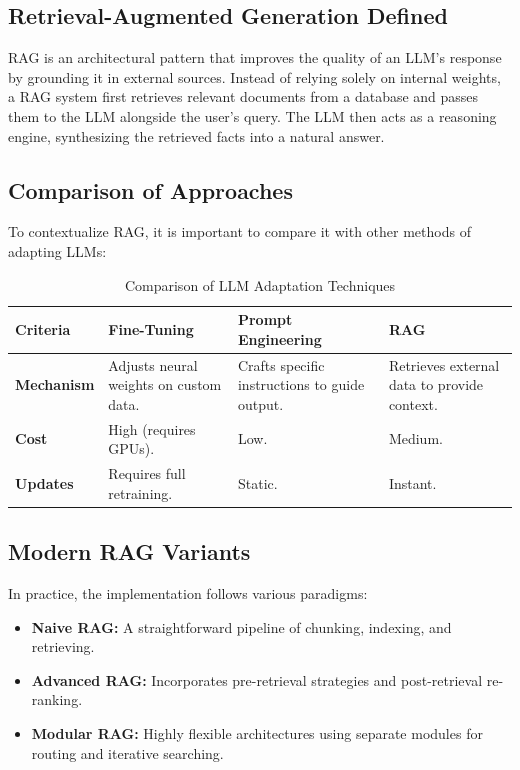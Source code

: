 \documentclass[11pt,a4paper]{article}
\begin{document}
\subsection{Retrieval-Augmented Generation Defined}
RAG is an architectural pattern that improves the quality of an LLM's response by grounding it in external sources. Instead of relying solely on internal weights, a RAG system first retrieves relevant documents from a database and passes them to the LLM alongside the user's query. The LLM then acts as a reasoning engine, synthesizing the retrieved facts into a natural answer.

\subsection{Comparison of Approaches}
To contextualize RAG, it is important to compare it with other methods of adapting LLMs:

\begin{table}[H]
\centering
\caption{Comparison of LLM Adaptation Techniques}
\renewcommand{\arraystretch}{1.3}
\begin{tabularx}{\textwidth}{|>{\raggedright\arraybackslash}p{2.5cm}|X|X|X|}
\hline
\rowcolor{lightbg}
\textbf{Criteria} & \textbf{Fine-Tuning} & \textbf{Prompt Engineering} & \textbf{RAG} \\
\hline
\textbf{Mechanism} & Adjusts neural weights on custom data. & Crafts specific instructions to guide output. & Retrieves external data to provide context. \\
\hline
\textbf{Cost} & High (requires GPUs). & Low. & Medium. \\
\hline
\textbf{Updates} & Requires full retraining. & Static. & Instant. \\
\hline
\end{tabularx}
\end{table}

\subsection{Modern RAG Variants}
In practice, the implementation follows various paradigms:
\begin{itemize}
    \item \textbf{Naive RAG:} A straightforward pipeline of chunking, indexing, and retrieving.
    \item \textbf{Advanced RAG:} Incorporates pre-retrieval strategies and post-retrieval re-ranking.
    \item \textbf{Modular RAG:} Highly flexible architectures using separate modules for routing and iterative searching.
\end{itemize}
\end{document}
